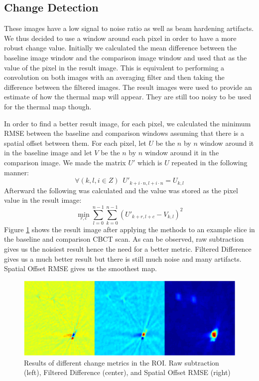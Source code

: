 \documentclass[]{spie}  %
\begin{document}
\subsection{Change Detection}

These images have a low signal to noise ratio as well as beam hardening artifacts. We thus decided to use a window around each pixel in order to have a more robust change value. Initially we calculated the mean difference between the baseline image window and the comparison image window and used that as the value of the pixel in the result image. This is equivalent to performing a convolution on both images with an averaging filter and then taking the difference between the filtered images. The result images were used to provide an estimate of how the thermal map will appear. They are still too noisy to be used for the thermal map though. 

In order to find a better result image, for each pixel, we calculated the minimum RMSE between the baseline and comparison windows assuming that there is a spatial offset between them. For each pixel, let $U$ be the $n$ by $n$ window around it in the baseline image and let $V$ be the $n$ by $n$ window around it in the comparison image. We made the matrix $U'$ which is $U$ repeated in the following manner:
\[
\forall(k,l,i \in Z)\, \, \, U'_{k+i \cdot n,l+i \cdot n} = U_{k,l}
\]
Afterward the following was calculated and the value was stored as the pixel value in the result image:
\[
\min_{r,c} \sum_{l=0}^{n-1} \sum_{k=0}^{n-1} {(U'_{k+r,l+c}-V_{k,l})^2}
\]
Figure \ref{changeDetectionMethods} shows the result image after applying the methods to an example slice in the baseline and comparison CBCT scan. As can be observed, raw subtraction gives us the noisiest result hence the need for a better metric. Filtered Difference gives us a much better result but there is still much noise and many artifacts. Spatial Offset RMSE gives us the smoothest map. 

\begin{figure} 
\centering 
\includegraphics[width=\textwidth]{changeDetectionPanel2.png} 
\caption{Results of different change metrics in the ROI. Raw subtraction (left), Filtered Difference (center), and Spatial Offset RMSE (right)} 
\label{changeDetectionMethods}
\end{figure}
\end{document}
